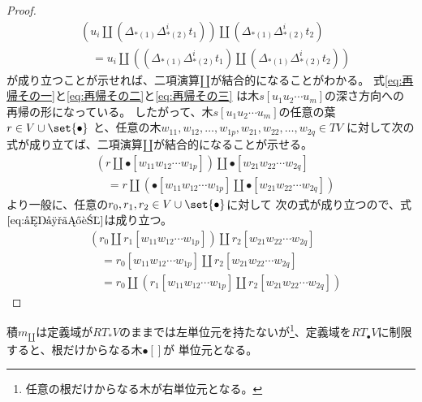 \begin{proof}
\begin{equation}
\begin{split}
			&\left(u_i\amalg (\Delta_{*(1)}\Delta_{*(2)}^it_1)\right)\amalg (\Delta_{*(1)}\Delta_{*(2)}^it_2) \\
			&\quad = u_i\amalg \left((\Delta_{*(1)}\Delta_{*(2)}^it_1)\amalg (\Delta_{*(1)}\Delta_{*(2)}^it_2)\right)
		\end{split}\end{equation} %
		が成り立つことが示せれば、二項演算$\amalg$が結合的になることがわかる。
		式\eqref{eq:再帰その一}と\eqref{eq:再帰その二}と\eqref{eq:再帰その三}
		は木$s[u_1u_2\cdots u_m]$の深さ方向への再帰の形になっている。
		したがって、木$s[u_1u_2\cdots u_m]$の任意の葉$r\in V\cup\set{\bullet}$
		と、任意の木$w_{11},w_{12},\dots,w_{1p},w_{21},w_{22},\dots,w_{2q}\in TV$
		に対して次の式が成り立てば、二項演算$\amalg$が結合的になることが示せる。
		\begin{equation}\label{eq:再帰の葉}\begin{split} %
			&\left(r\amalg \bullet[w_{11}w_{12}\cdots w_{1p}]\right)\amalg \bullet[w_{21}w_{22}\cdots w_{2q}] \\
			&\quad = r\amalg \left(\bullet[w_{11}w_{12}\cdots w_{1p}]\amalg \bullet[w_{21}w_{22}\cdots w_{2q}]\right)
		\end{split}\end{equation} %
		より一般に、任意の$r_0,r_1,r_2\in V\cup\set{\bullet}$に対して
		次の式が成り立つので、式$\eqref{eq:再帰の葉}$は成り立つ。
		\begin{equation}\begin{split} %
			&\left(r_0\amalg r_1[w_{11}w_{12}\cdots w_{1p}]\right)\amalg r_2[w_{21}w_{22}\cdots w_{2q}] \\
			&\quad = r_0[w_{11}w_{12}\cdots w_{1p}]\amalg r_2[w_{21}w_{22}\cdots w_{2q}] \\
			&\quad = r_0\amalg \left(r_1[w_{11}w_{12}\cdots w_{1p}]\amalg r_2[w_{21}w_{22}\cdots w_{2q}]\right)
		\end{split}\end{equation} %
	\end{proof} %

	積$m_\amalg$は定義域が$RT_*V$のままでは左単位元を持たないが\footnote{
		任意の根だけからなる木が右単位元となる。
	}、定義域を$RT_\bullet V$に制限すると、根だけからなる木$\bullet[]$が
	単位元となる。

